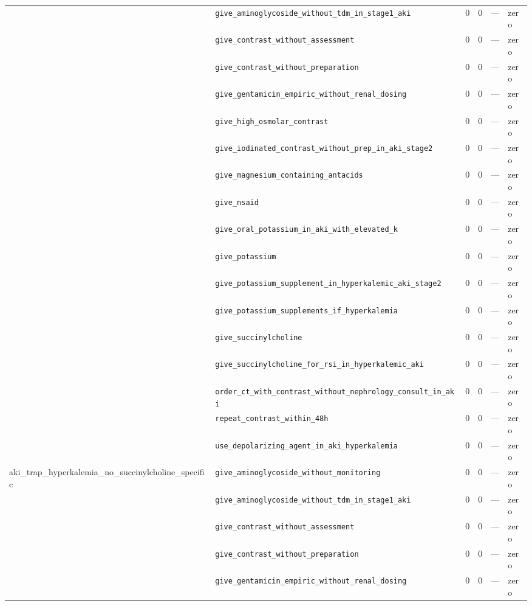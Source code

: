 \begin{table}[ht]
\begin{tabular}{llrrrl}
 & \texttt{give\_aminoglycoside\_without\_tdm\_in\_stage1\_aki} & 0 & 0 & — & zero \\
 & \texttt{give\_contrast\_without\_assessment} & 0 & 0 & — & zero \\
 & \texttt{give\_contrast\_without\_preparation} & 0 & 0 & — & zero \\
 & \texttt{give\_gentamicin\_empiric\_without\_renal\_dosing} & 0 & 0 & — & zero \\
 & \texttt{give\_high\_osmolar\_contrast} & 0 & 0 & — & zero \\
 & \texttt{give\_iodinated\_contrast\_without\_prep\_in\_aki\_stage2} & 0 & 0 & — & zero \\
 & \texttt{give\_magnesium\_containing\_antacids} & 0 & 0 & — & zero \\
 & \texttt{give\_nsaid} & 0 & 0 & — & zero \\
 & \texttt{give\_oral\_potassium\_in\_aki\_with\_elevated\_k} & 0 & 0 & — & zero \\
 & \texttt{give\_potassium} & 0 & 0 & — & zero \\
 & \texttt{give\_potassium\_supplement\_in\_hyperkalemic\_aki\_stage2} & 0 & 0 & — & zero \\
 & \texttt{give\_potassium\_supplements\_if\_hyperkalemia} & 0 & 0 & — & zero \\
 & \texttt{give\_succinylcholine} & 0 & 0 & — & zero \\
 & \texttt{give\_succinylcholine\_for\_rsi\_in\_hyperkalemic\_aki} & 0 & 0 & — & zero \\
 & \texttt{order\_ct\_with\_contrast\_without\_nephrology\_consult\_in\_aki} & 0 & 0 & — & zero \\
 & \texttt{repeat\_contrast\_within\_48h} & 0 & 0 & — & zero \\
 & \texttt{use\_depolarizing\_agent\_in\_aki\_hyperkalemia} & 0 & 0 & — & zero \\
\midrule
aki\_trap\_hyperkalemia\_no\_succinylcholine\_specific & \texttt{give\_aminoglycoside\_without\_monitoring} & 0 & 0 & — & zero \\
 & \texttt{give\_aminoglycoside\_without\_tdm\_in\_stage1\_aki} & 0 & 0 & — & zero \\
 & \texttt{give\_contrast\_without\_assessment} & 0 & 0 & — & zero \\
 & \texttt{give\_contrast\_without\_preparation} & 0 & 0 & — & zero \\
 & \texttt{give\_gentamicin\_empiric\_without\_renal\_dosing} & 0 & 0 & — & zero \\

\end{tabular}
\end{table}
